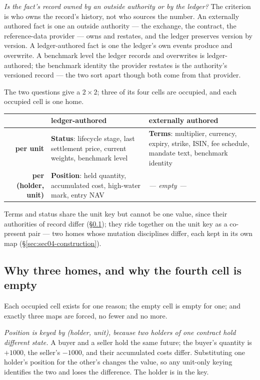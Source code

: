 \emph{Is the fact's record owned by an outside authority or by the ledger?} The criterion
is who owns the record's history, not who sources the number. An externally authored fact
is one an outside authority --- the exchange, the contract, the reference-data provider
--- owns and restates, and the ledger preserves version by version. A ledger-authored
fact is one the ledger's own events produce and overwrite. A benchmark level the ledger
records and overwrites is ledger-authored; the benchmark identity the provider restates is
the authority's versioned record --- the two sort apart though both come from that
provider.

The two questions give a $2\times2$; three of its four cells are occupied, and each
occupied cell is one home.

\begin{center}
\begin{tabular}{@{}r p{} p{}@{}}
\toprule
 & \textbf{ledger-authored} & \textbf{externally authored} \\
\midrule
\textbf{per unit} & \textbf{Status}: lifecycle stage, last settlement price, current
weights, benchmark level & \textbf{Terms}: multiplier, currency, expiry, strike, ISIN,
fee schedule, mandate text, benchmark identity \\
\addlinespace
\textbf{per (holder, unit)} & \textbf{Position}: held quantity, accumulated cost,
high-water mark, entry NAV & \textit{--- empty ---} \\
\bottomrule
\end{tabular}
\end{center}

Terms and status share the unit key but cannot be one value, since their authorities of
record differ (\S\ref{sec:sec04-three}); they ride together on the unit key as a
co-present pair --- two homes whose mutation disciplines differ, each kept in its own map
(\S\ref{sec:sec04-construction}).

\subsection{Why three homes, and why the fourth cell is empty}
\label{sec:sec04-three}

Each occupied cell exists for one reason; the empty cell is empty for one; and exactly
three maps are forced, no fewer and no more.

\emph{Position is keyed by (holder, unit), because two holders of one contract hold
different state.} A buyer and a seller hold the same future; the buyer's quantity is
$+1000$, the seller's $-1000$, and their accumulated costs differ. Substituting one
holder's position for the other's changes the value, so any unit-only keying identifies the
two and loses the difference. The holder is in the key.

